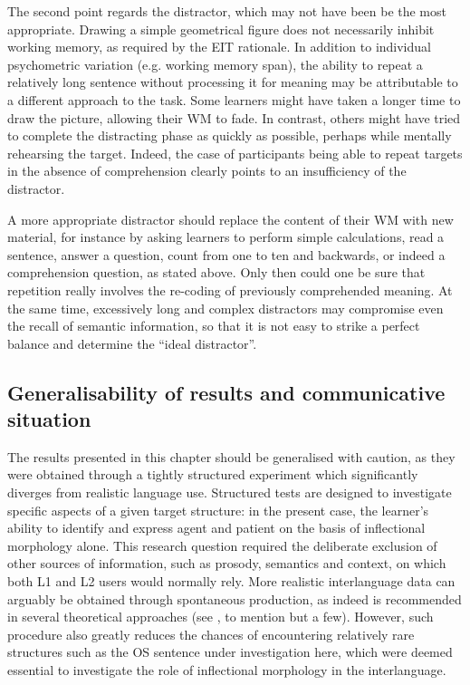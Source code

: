 The second point regards the distractor, which may not have been be the most appropriate. Drawing a simple geometrical figure does not necessarily inhibit working memory, as required by the EIT rationale. In addition to individual psychometric variation (e.g. working memory span), the ability to repeat a relatively long sentence without processing it for meaning may be attributable to a different approach to the task. Some learners might have taken a longer time to draw the picture, allowing their WM to fade. In contrast, others might have tried to complete the distracting phase as quickly as possible, perhaps while mentally rehearsing the target. Indeed, the case of participants being able to repeat targets in the absence of comprehension clearly points to an insufficiency of the distractor. 

A more appropriate distractor should replace the content of their WM with new material, for instance by asking learners to perform simple calculations, read a sentence, answer a question, count from one to ten and backwards, or indeed a comprehension question, as stated above. Only then could one be sure that repetition really involves the re-coding of previously comprehended meaning. At the same time, excessively long and complex distractors may compromise even the recall of semantic information, so that it is not easy to strike a perfect balance and determine the “ideal distractor”.

\subsection{Generalisability of results and communicative situation}\label{sec:08:6.2}

The results presented in this chapter should be generalised with caution, as they were obtained through a tightly structured experiment which significantly diverges from realistic language use. Structured tests are designed to investigate specific aspects of a given target structure: in the present case, the learner’s ability to identify and express agent and patient on the basis of inflectional morphology alone. This research question required the deliberate exclusion of other sources of information, such as prosody, semantics and context, on which both L1 and L2 users would normally rely. More realistic interlanguage data can arguably be obtained through spontaneous production, as indeed is recommended in several theoretical approaches (see \citealt{Krashen1985, Perdue1993, Pienemann1998}, to mention but a few). However, such procedure also greatly reduces the chances of encountering relatively rare structures such as the OS sentence under investigation here, which were deemed essential to investigate the role of inflectional morphology in the interlanguage.

